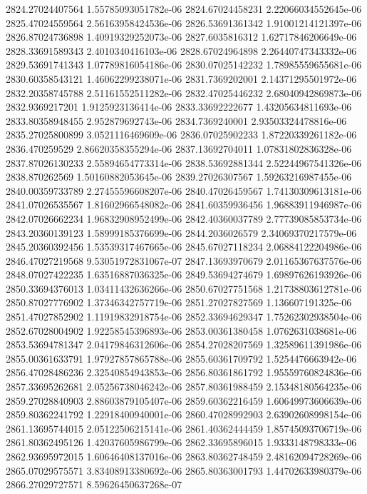 {2824.27024407564 1.55785093051782e-06
2824.67024458231 2.22066034552645e-06
2825.47024559564 2.56163958424536e-06
2826.53691361342 1.91001214121397e-06
2826.87024736898 1.40919329252073e-06
2827.6035816312 1.62717846206649e-06
2828.33691589343 2.4010340416103e-06
2828.67024964898 2.26440747343332e-06
2829.53691741343 1.07789816054186e-06
2830.07025142232 1.78985559655681e-06
2830.60358543121 1.46062299238071e-06
2831.7369202001 2.14371295501972e-06
2832.20358745788 2.51161552511282e-06
2832.47025446232 2.68040942869873e-06
2832.9369217201 1.9125923136414e-06
2833.33692222677 1.43205634811693e-06
2833.80358948455 2.952879692743e-06
2834.7369240001 2.93503324478816e-06
2835.27025800899 3.0521116469609e-06
2836.07025902233 1.87220339261182e-06
2836.470259529 2.86620358355294e-06
2837.13692704011 1.07831802836328e-06
2837.87026130233 2.55894654773314e-06
2838.53692881344 2.52244967541326e-06
2838.870262569 1.50160882053645e-06
2839.27026307567 1.59263216987455e-06
2840.00359733789 2.27455596608207e-06
2840.47026459567 1.74130309613181e-06
2841.07026535567 1.81602966548082e-06
2841.60359936456 1.96883911946987e-06
2842.07026662234 1.96832908952499e-06
2842.40360037789 2.77739085853734e-06
2843.20360139123 1.58999185376699e-06
2844.2036026579 2.34069370217579e-06
2845.20360392456 1.53539317467665e-06
2845.67027118234 2.06884122204986e-06
2846.47027219568 9.53051972831067e-07
2847.13693970679 2.01165367637576e-06
2848.07027422235 1.63516887036325e-06
2849.53694274679 1.69897626193926e-06
2850.33694376013 1.03411432636266e-06
2850.67027751568 1.21738803612781e-06
2850.87027776902 1.37346342757719e-06
2851.27027827569 1.136607191325e-06
2851.47027852902 1.11919832918754e-06
2852.33694629347 1.75262302938504e-06
2852.67028004902 1.92258545396893e-06
2853.00361380458 1.0762631038681e-06
2853.53694781347 2.04179846312606e-06
2854.27028207569 1.32589611391986e-06
2855.00361633791 1.97927857865788e-06
2855.60361709792 1.5254476663942e-06
2856.47028486236 2.32540854943853e-06
2856.80361861792 1.95559760824836e-06
2857.33695262681 2.05256738046242e-06
2857.80361988459 2.15348180564235e-06
2859.27028840903 2.88603879105407e-06
2859.60362216459 1.60649973606639e-06
2859.80362241792 1.22918400940001e-06
2860.47028992903 2.63902608998154e-06
2861.13695744015 2.05122506215141e-06
2861.40362444459 1.85745093706719e-06
2861.80362495126 1.42037605986799e-06
2862.33695896015 1.9333148798333e-06
2862.93695972015 1.60646408137016e-06
2863.80362748459 2.48162094728269e-06
2865.07029575571 3.83408913380692e-06
2865.80363001793 1.44702633980379e-06
2866.27029727571 8.59626450637268e-07
}
